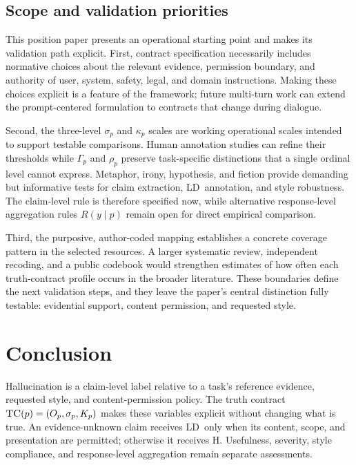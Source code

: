 \documentclass{clv2025}
\newcommand{\TC}{\textsc{TC}}
\newcommand{\LD}{\textsc{LD}}
\newcommand{\Hall}{\textsc{H}}
\begin{document}
\subsection{Scope and validation priorities}

This position paper presents an operational starting point and makes its validation path explicit.
First, contract specification necessarily includes normative choices about the relevant evidence, permission boundary, and authority of user, system, safety, legal, and domain instructions.
Making these choices explicit is a feature of the framework; future multi-turn work can extend the prompt-centered formulation to contracts that change during dialogue.

Second, the three-level $\sigma_p$ and $\kappa_p$ scales are working operational scales intended to support testable comparisons.
Human annotation studies can refine their thresholds while $\Gamma_p$ and $\rho_p$ preserve task-specific distinctions that a single ordinal level cannot express.
Metaphor, irony, hypothesis, and fiction provide demanding but informative tests for claim extraction, \LD\ annotation, and style robustness.
The claim-level rule is therefore specified now, while alternative response-level aggregation rules $R(y\mid p)$ remain open for direct empirical comparison.

Third, the purposive, author-coded mapping establishes a concrete coverage pattern in the selected resources.
A larger systematic review, independent recoding, and a public codebook would strengthen estimates of how often each truth-contract profile occurs in the broader literature.
These boundaries define the next validation steps, and they leave the paper's central distinction fully testable: evidential support, content permission, and requested style.


\section{Conclusion}\label{sec:conclusion}

Hallucination is a claim-level label relative to a task's reference evidence, requested style, and content-permission policy.
The truth contract $\TC(p)=(O_p,\sigma_p,K_p)$ makes these variables explicit without changing what is true.
An evidence-unknown claim receives \LD\ only when its content, scope, and presentation are permitted; otherwise it receives \Hall.
Usefulness, severity, style compliance, and response-level aggregation remain separate assessments.
\end{document}

